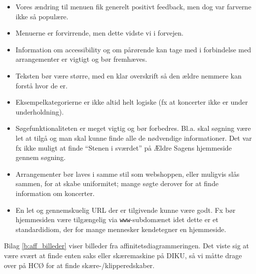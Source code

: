 \begin{itemize}
    \item Vores ændring til menuen fik generelt positivt feedback, men dog var farverne ikke så populære.
    \item Menuerne er forvirrende, men dette vidste vi i forvejen.
    \item Information om accessibility og om pårørende kan tage med i forbindelse med arrangementer er vigtigt og bør fremhæves.
    \item Teksten bør være større, med en klar overskrift så den ældre nemmere kan forstå hvor de er.
    \item Eksempelkategorierne er ikke altid helt logiske (fx at koncerter ikke er under underholdning).
    \item Søgefunktionaliteten er meget vigtig og bør forbedres. Bl.a. skal søgning være let at tilgå og man skal kunne finde alle de nødvendige informationer. Det var fx ikke muligt at finde ``Stenen i sværdet'' på Ældre Sagens hjemmeside gennem søgning.
    \item Arrangementer bør laves i samme stil som webshoppen, eller muligvis slås sammen, for at skabe uniformitet; mange søgte derover for at finde information om koncerter.
    \item En let og gennemskuelig URL der er tilgivende kunne være godt. Fx bør hjemmesiden være tilgængelig via \texttt{www}-subdomænet idet dette er et standardidiom, der for mange mennesker kendetegner en hjemmeside.
\end{itemize}

Bilag \ref{b:aff_billeder} viser billeder fra affinitetsdiagrammeringen. Det
viste sig at være svært at finde enten saks eller skæremaskine på DIKU,
så vi måtte drage over på HCØ for at finde skære-/klipperedskaber.
